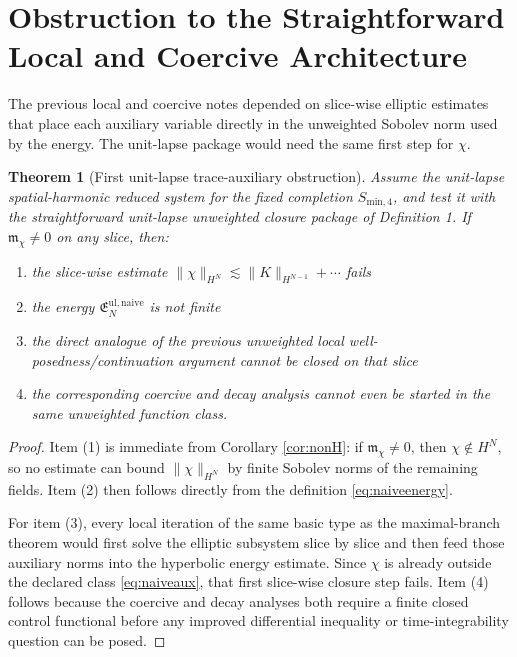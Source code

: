 \documentclass[11pt]{article}
\newtheorem{theorem}{Theorem}
\begin{document}
\section{Obstruction to the Straightforward Local and Coercive Architecture}

The previous local and coercive notes depended on slice-wise elliptic estimates that place each auxiliary variable directly in the unweighted Sobolev norm used by the energy. The unit-lapse package would need the same first step for \(\chi\).

\begin{theorem}[First unit-lapse trace-auxiliary obstruction]
\label{thm:obstruction}
Assume the unit-lapse spatial-harmonic reduced system for the fixed completion \(S_{\mathrm{min},4}\), and test it with the straightforward unit-lapse unweighted closure package of Definition 1. If \(\mathfrak m_\chi\neq 0\) on any slice, then:
\begin{enumerate}
    \item the slice-wise estimate \(\|\chi\|_{H^N}\lesssim \|K\|_{H^{N-1}}+\cdots\) fails
    \item the energy \(\mathfrak E_N^{\mathrm{ul,naive}}\) is not finite
    \item the direct analogue of the previous unweighted local well-posedness/continuation argument cannot be closed on that slice
    \item the corresponding coercive and decay analysis cannot even be started in the same unweighted function class.
\end{enumerate}
\end{theorem}

\begin{proof}
Item (1) is immediate from Corollary \ref{cor:nonH}: if \(\mathfrak m_\chi\neq 0\), then \(\chi\notin H^N\), so no estimate can bound \(\|\chi\|_{H^N}\) by finite Sobolev norms of the remaining fields. Item (2) then follows directly from the definition \eqref{eq:naiveenergy}.

For item (3), every local iteration of the same basic type as the maximal-branch theorem would first solve the elliptic subsystem slice by slice and then feed those auxiliary norms into the hyperbolic energy estimate. Since \(\chi\) is already outside the declared class \eqref{eq:naiveaux}, that first slice-wise closure step fails. Item (4) follows because the coercive and decay analyses both require a finite closed control functional before any improved differential inequality or time-integrability question can be posed.
\end{proof}
\end{document}
